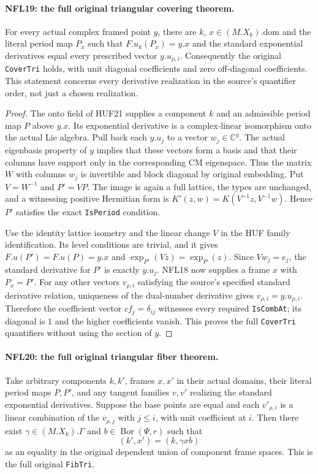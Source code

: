 \documentclass[11pt,a4paper]{article}
\numberwithin{equation}{section}
\theoremstyle{remark}\newtheorem{remark}[theorem]{Remark}
\begin{document}
\paragraph{NFL19: the full original triangular covering theorem.}
\label{claim:NFL19}
For every actual complex framed point $y$, there are $k$,
$x\in(M.X_k).\mathrm{dom}$ and the literal period map $P_x$
such that $F.u_k(P_x)=y.x$ and the standard exponential
derivatives equal every prescribed vector $y.u_{\rho,i}$.
Consequently the original \texttt{Cover\allowbreak Tri} holds, with unit
diagonal coefficients and zero off-diagonal coefficients.
This statement concerns every derivative realization in the
source's quantifier order, not just a chosen realization.

\begin{proof}
The onto field of HUF21 supplies a component $k$ and an admissible
period map $P$ above $y.x$.  Its exponential derivative is a
complex-linear isomorphism onto the actual Lie algebra.
Pull back each $y.u_j$ to a vector $w_j\in\mathbb C^g$.
The actual eigenbasis property of $y$ implies that these vectors
form a basis and that their columns have support only in the
corresponding CM eigenspace.  Thus the matrix $W$ with columns
$w_j$ is invertible and block diagonal by original embedding.
Put $V=W^{-1}$ and $P'=VP$.  The image is again a full lattice,
the types are unchanged, and a witnessing positive Hermitian
form is $K'(z,w)=K(V^{-1}z,V^{-1}w)$.  Hence $P'$ satisfies
the exact \texttt{Is\allowbreak Period} condition.

Use the identity lattice isometry and the linear change $V$ in
the HUF family identification.  Its level conditions are
trivial, and it gives
$F.u(P')=F.u(P)=y.x$ and $\exp_{P'}(Vz)=\exp_P(z)$.
Since $Vw_j=e_j$, the standard derivative for $P'$ is exactly
$y.u_j$.  NFL18 now supplies a frame $x$ with $P_x=P'$.
For any other vectors $v_{\rho,i}$ satisfying the source's
specified standard derivative relation, uniqueness of the
dual-number derivative gives $v_{\rho,i}=y.u_{\rho,i}$.
Therefore the coefficient vector $cf_j=\delta_{ij}$ witnesses
every required \texttt{Is\allowbreak Comb\allowbreak At}; its diagonal is $1$ and
the higher coefficients vanish.  This proves the full
\texttt{Cover\allowbreak Tri} quantifiers without using the section of $y$.
\end{proof}

\paragraph{NFL20: the full original triangular fiber theorem.}
\label{claim:NFL20}
Take arbitrary components $k,k'$, frames $x,x'$ in their actual
domains, their literal period maps $P,P'$, and any tangent
families $v,v'$ realizing the standard exponential derivatives.
Suppose the base points are equal and each $v'_{\rho,i}$ is a
linear combination of the $v_{\rho,j}$ with $j\le i$, with
unit coefficient at $i$.  Then there exist
$\gamma\in(M.X_k).\Gamma$ and $b\in\operatorname{Bor}(\Psi,r)$
such that
\[
 (k',x')=(k,\gamma x b)
 \tag{NFL.27}
\]
as an equality in the original dependent union of component
frame spaces.  This is the full original \texttt{Fib\allowbreak Tri}.
\end{document}
